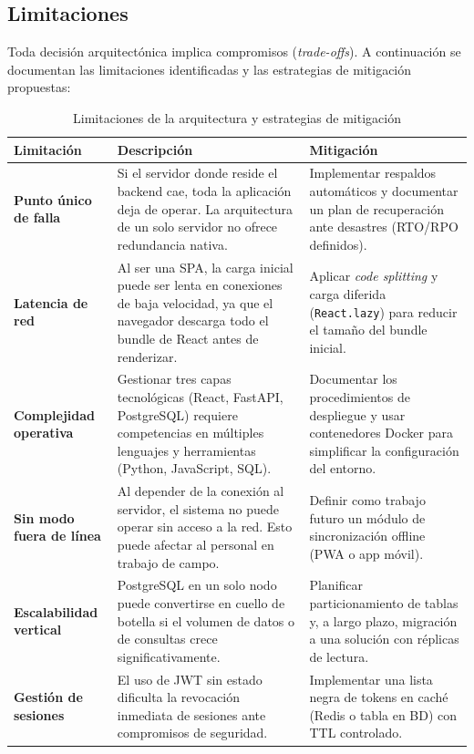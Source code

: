 \subsection{Limitaciones}

Toda decisión arquitectónica implica compromisos (\textit{trade-offs}). A continuación
se documentan las limitaciones identificadas y las estrategias de mitigación propuestas:

\begin{table}[h!]
	\centering
	\caption{Limitaciones de la arquitectura y estrategias de mitigación}
	\renewcommand{\arraystretch}{1.4}
	\begin{tabular}{|p{3cm}|p{5.8cm}|p{4.2cm}|}
		\hline
		\textbf{Limitación}             & \textbf{Descripción}                                                                  & \textbf{Mitigación}                              \\ \hline
		\textbf{Punto único de falla}   & Si el servidor donde reside el backend cae, toda la aplicación deja de operar.
		La arquitectura de un solo servidor no ofrece redundancia nativa.                  & Implementar respaldos automáticos y documentar
		un plan de recuperación ante desastres (RTO/RPO
		definidos).                                       \\ \hline
		\textbf{Latencia de red}        & Al ser una SPA, la carga inicial puede ser lenta en conexiones de baja velocidad,
		ya que el navegador descarga todo el bundle de React antes de renderizar.          & Aplicar \textit{code splitting} y carga diferida
		(\texttt{React.lazy}) para reducir el tamaño del
		bundle inicial.                                   \\ \hline
		\textbf{Complejidad operativa}  & Gestionar tres capas tecnológicas (React, FastAPI, PostgreSQL) requiere competencias
		en múltiples lenguajes y herramientas (Python, JavaScript, SQL).                   & Documentar los procedimientos de despliegue y
		usar contenedores Docker para simplificar la
		configuración del entorno.                        \\ \hline
		\textbf{Sin modo fuera de línea}& Al depender de la conexión al servidor, el sistema no puede operar sin acceso
		a la red. Esto puede afectar al personal en trabajo de campo.                      & Definir como trabajo futuro un módulo de
		sincronización offline (PWA o app móvil).         \\ \hline
		\textbf{Escalabilidad vertical} & PostgreSQL en un solo nodo puede convertirse en cuello de botella si el volumen
		de datos o de consultas crece significativamente.                                  & Planificar particionamiento de tablas y, a largo
		plazo, migración a una solución con réplicas de
		lectura.                                          \\ \hline
		\textbf{Gestión de sesiones}    & El uso de JWT sin estado dificulta la revocación inmediata de sesiones ante
		compromisos de seguridad.                                                          & Implementar una lista negra de tokens en
		caché (Redis o tabla en BD) con TTL controlado.   \\ \hline
	\end{tabular}
	\label{tab:limitaciones-arq}
\end{table}